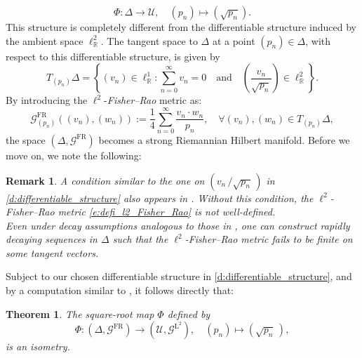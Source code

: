 \documentclass[12pt]{amsart}
\newtheorem{theorem}{Theorem}[section]
\newtheorem{remark}[remark]{Remark}
\numberwithin{figure}{section}
\numberwithin{table}{section}
\numberwithin{equation}{section}
\begin{document}
\[
	\varPhi: \Delta \longrightarrow \mathcal{U}, \quad (p_n) \mapsto (\sqrt{p_n}).
\]
This structure is completely different from the differentiable structure induced by the ambient space $\ell^2_{\mathbb{R}}$. The tangent space to $\Delta$ at a point $(p_n) \in \Delta$, with respect to this differentiable structure, is given by
\begin{equation}
\label{d:differentiable_structure}
    T_{(p_n)}\Delta = \left\{ (v_n) \in \ell^1_{\mathbb{R}} : \sum_{n=0}^{\infty} v_n = 0 \quad \text{and} \quad \left(\frac{v_n}{\sqrt{p_n}}\right) \in \ell^2_{\mathbb{R}} \right\}.
\end{equation}
By introducing the $\ell^2$-\emph{Fisher--Rao} metric as:
\begin{equation}\label{e:defi_l2_Fisher_Rao}
	\mathcal{G}^{\mathrm{FR}}_{(p_n)}\left((v_n), (w_n) \right) := \frac{1}{4}\sum_{n=0}^{\infty} \frac{v_n \cdot w_n}{p_n}, \quad \forall (v_n), (w_n) \in T_{(p_n)}\Delta,
\end{equation}
the space $(\Delta, \mathcal{G}^{\mathrm{FR}})$ becomes a strong Riemannian Hilbert manifold. Before we move on, we note the following:

\begin{remark}\label{r: the right diff strcuture}
A condition similar to the one on \( \left(v_n\,/\sqrt{p_n}\,\right) \) in \eqref{d:differentiable_structure} also appears in \cite[§2]{Friedrich1991}. Without this condition, the \( \ell^2 \)-Fisher–Rao metric \eqref{e:defi_l2_Fisher_Rao} is not well-defined.\\
Even under decay assumptions analogous to those in \cite[§3.5]{MichorMumfordZoo}, one can construct rapidly decaying sequences in \( \Delta \) such that the \( \ell^2 \)-Fisher–Rao metric fails to be finite on some tangent vectors. 
\end{remark}
Subject to our chosen differentiable structure in \eqref{d:differentiable_structure}, and by a computation similar to \cite[Thm. 3.1]{khesin_GAFA}, it follows directly that:

\begin{theorem}\label{t: square root map is isometry}
The square-root map \( \varPhi \) defined by
\[
\varPhi: (\Delta, \mathcal{G}^{\mathrm{FR}}) \longrightarrow (\mathcal{U}, \mathcal{G}^{\mathrm{L}^2}), \quad (p_n) \mapsto (\sqrt{p_n}\,),
\]
is an isometry.
\end{theorem}
\end{document}
